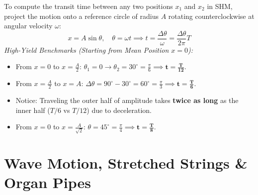 \documentclass[10pt,a4paper]{article}
\begin{document}
\begin{usecasebox}
To compute the transit time between any two positions $x_1$ and $x_2$ in SHM, project the motion onto a reference circle of radius $A$ rotating counterclockwise at angular velocity $\omega$:
\begin{equation}
  x = A \sin\theta, \quad \theta = \omega t \implies t = \frac{\Delta\theta}{\omega} = \frac{\Delta\theta}{2\pi} T
\end{equation}
\textit{High-Yield Benchmarks (Starting from Mean Position $x=0$):}
\begin{itemize}
  \item From $x = 0$ to $x = \frac{A}{2}$: $\theta_1 = 0 \to \theta_2 = 30^\circ = \frac{\pi}{6} \implies \mathbf{t = \frac{T}{12}}$.
  \item From $x = \frac{A}{2}$ to $x = A$: $\Delta\theta = 90^\circ - 30^\circ = 60^\circ = \frac{\pi}{3} \implies \mathbf{t = \frac{T}{6}}$.
  \item Notice: Traveling the outer half of amplitude takes \textbf{twice as long} as the inner half ($T/6$ vs $T/12$) due to deceleration.
  \item From $x = 0$ to $x = \frac{A}{\sqrt{2}}$: $\theta = 45^\circ = \frac{\pi}{4} \implies \mathbf{t = \frac{T}{8}}$.
\end{itemize}
\end{usecasebox}

\section{Wave Motion, Stretched Strings \& Organ Pipes}
\end{document}
